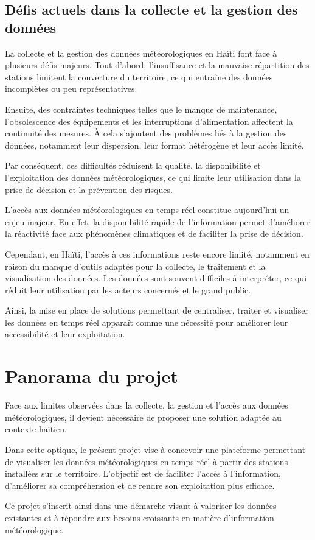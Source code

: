 \clearpage
\subsection{Défis actuels dans la collecte et la gestion des données}
La collecte et la gestion des données météorologiques en Haïti font face à plusieurs défis majeurs. Tout d’abord, l’insuffisance et la mauvaise répartition des stations limitent la couverture du territoire, ce qui entraîne des données incomplètes ou peu représentatives.

Ensuite, des contraintes techniques telles que le manque de maintenance, l’obsolescence des équipements et les interruptions d’alimentation affectent la continuité des mesures. À cela s’ajoutent des problèmes liés à la gestion des données, notamment leur dispersion, leur format hétérogène et leur accès limité.

Par conséquent, ces difficultés réduisent la qualité, la disponibilité et l’exploitation des données météorologiques, ce qui limite leur utilisation dans la prise de décision et la prévention des risques.

L’accès aux données météorologiques en temps réel constitue aujourd’hui un enjeu majeur. En effet, la disponibilité rapide de l’information permet d’améliorer la réactivité face aux phénomènes climatiques et de faciliter la prise de décision.

Cependant, en Haïti, l’accès à ces informations reste encore limité, notamment en raison du manque d’outils adaptés pour la collecte, le traitement et la visualisation des données. Les données sont souvent difficiles à interpréter, ce qui réduit leur utilisation par les acteurs concernés et le grand public.

Ainsi, la mise en place de solutions permettant de centraliser, traiter et visualiser les données en temps réel apparaît comme une nécessité pour améliorer leur accessibilité et leur exploitation.

\section{Panorama du projet}

Face aux limites observées dans la collecte, la gestion et l’accès aux données météorologiques, il devient nécessaire de proposer une solution adaptée au contexte haïtien.

Dans cette optique, le présent projet vise à concevoir une plateforme permettant de visualiser les données météorologiques en temps réel à partir des stations installées sur le territoire. L’objectif est de faciliter l’accès à l’information, d’améliorer sa compréhension et de rendre son exploitation plus efficace.

Ce projet s’inscrit ainsi dans une démarche visant à valoriser les données existantes et à répondre aux besoins croissants en matière d’information météorologique.